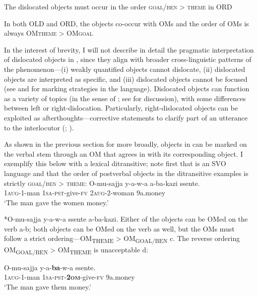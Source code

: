 \documentclass[output=paper
,newtxmath
,modfonts
,nonflat]{langsci/langscibook}
\begin{document}
\ex\label{ex:ranero:7bii}  The dislocated objects must occur in the order \textsc{goal/ben > theme} in ORD

\ex\label{ex:ranero:7biii}  In both OLD and ORD, the objects co-occur with OMs and the order of OMs is always OM\textsc{theme} > OM\textsc{goal}
\z
\z
\z

In the interest of brevity, I will not describe in detail the pragmatic interpretation of dislocated objects in , since they align with broader cross-linguistic patterns of the phenomenon—(i) weakly quantified objects cannot dislocate, (ii) dislocated objects are interpreted as specific, and (iii) dislocated objects cannot be focused (see \citealt{Hyman1993} and \citealt{vanderwal2016} for  marking strategies in the language). Dislocated objects can function as a variety of topics (in the sense of \citealt{Reinhart1981}; see \citealt{ranero2015} for discussion), with some differences between left or right-dislocation. Particularly, right-dislocated objects can be exploited as afterthoughts—corrective statements to clarify part of an utterance to the interlocutor (\citealt{grosz1998}; \citealt{Villalba2000}). 

As shown in the previous section for  more broadly, objects in  can be marked on the verbal stem through an OM that agrees in  with its corresponding object. I exemplify this below with a lexical ditransitive; note first that  is an SVO language and that the order of postverbal objects in the ditransitive examples is strictly \textsc{goal/ben > theme}:
\ea\label{ex:ranero:8}
\ea\label{ex:ranero:8a}
\gll O-mu-sajja    y-a-w-a          a-ba-kazi   ssente.\\
\textsc{1aug-}1-man \textsc{1sa-pst}{}-give-\textsc{fv} 2\textsc{aug}{}-2-woman 9a.money\\
\glt ‘The man gave the women money.’

\ex\label{ex:ranero:8b}*O-mu-sajja y-a-w-a ssente a-ba-kazi.
\z
\z
Either of the objects can be OMed on the verb a-b; both objects can be OMed on the verb as well, but the OMs must follow a strict ordering—OM\textsubscript{THEME} > OM\textsubscript{GOAL/BEN} c. The reverse ordering OM\textsubscript{GOAL/BEN} >\textsubscript{} OM\textsubscript{THEME} is unacceptable d:

\ea\label{ex:ranero:9}
\ea\label{ex:ranero:9a}
\gll O-mu-sajja    y-a-\textbf{ba}{}-w-a                  ssente.\\
1\textsc{aug}{}-1-man \textsc{1sa-pst-}\textbf{\textsc{2om}}{}-give-\textsc{fv} 9a.money\\
\glt ‘The man gave them money.’
\end{document}
